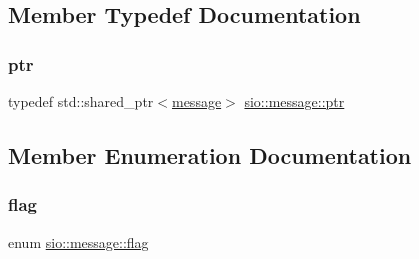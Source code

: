 \subsection{Member Typedef Documentation}
\mbox{\label{classsio_1_1message_a6340b6fef57e4516eb17928b1885a615}} 
\subsubsection{\texorpdfstring{ptr}{ptr}}
{\footnotesize\ttfamily typedef std\+::shared\+\_\+ptr$<$\hyperlink{classsio_1_1message}{message}$>$ \hyperlink{classsio_1_1message_a6340b6fef57e4516eb17928b1885a615}{sio\+::message\+::ptr}}



\subsection{Member Enumeration Documentation}
\mbox{\label{classsio_1_1message_a5274f78a8f77cd535d4acf476badf769}} 
\subsubsection{\texorpdfstring{flag}{flag}}
{\footnotesize\ttfamily enum \hyperlink{classsio_1_1message_a5274f78a8f77cd535d4acf476badf769}{sio\+::message\+::flag}}

